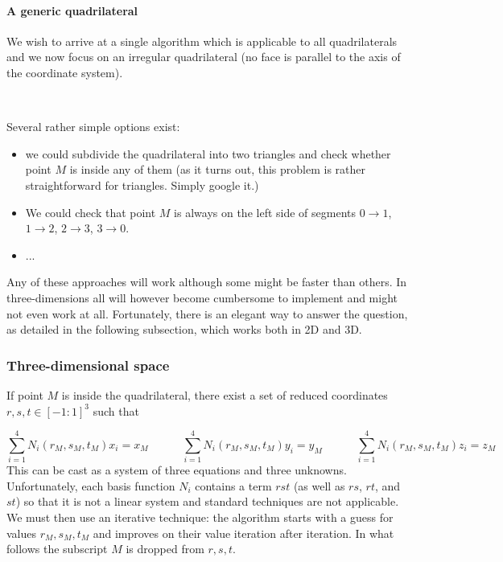 \paragraph{A generic quadrilateral}

We wish to arrive at a single algorithm which is applicable to all quadrilaterals and we now focus  
on an irregular quadrilateral (no face is parallel to the axis of the coordinate system). 

\begin{center}
\\
\end{center}

Several rather simple options exist:
\begin{itemize}
\item we could subdivide the quadrilateral into two triangles and check whether point $M$ is inside any of them (as it turns out, 
this problem is rather straightforward for triangles. Simply google it.)
\item We could check that point $M$ is always on the left side of segments $0\rightarrow 1$, $1\rightarrow 2$, $2\rightarrow 3$, $3\rightarrow 0$.
\item ...  
\end{itemize}

Any of these approaches will work although some might be faster than others. In three-dimensions all will however become 
cumbersome to implement and might not even work at all. Fortunately, there is an elegant way to answer the question, as 
detailed in the following subsection, which works both in 2D and 3D.

\subsubsection{Three-dimensional space}

If point $M$ is inside the quadrilateral, there exist a set of reduced coordinates $r,s,t\in[-1:1]^3$ such that 

\[
\sum_{i=1}^4 N_i(r_M,s_M,t_M) x_i = x_M
\quad\quad\quad
\sum_{i=1}^4 N_i(r_M,s_M,t_M) y_i = y_M
\quad\quad\quad
\sum_{i=1}^4 N_i(r_M,s_M,t_M) z_i = z_M
\]
This can be cast as a system of three equations and three unknowns. Unfortunately, each basis function $N_i$ 
contains a term $rst$ (as well as $rs$, $rt$, and $st$) so that it is not a linear system and standard techniques
are not applicable. 
We must then use an iterative technique: the algorithm starts with a guess for values $r_M,s_M,t_M$ and 
improves on their value iteration after iteration. In what follows the subscript $M$ is dropped from $r,s,t$.

